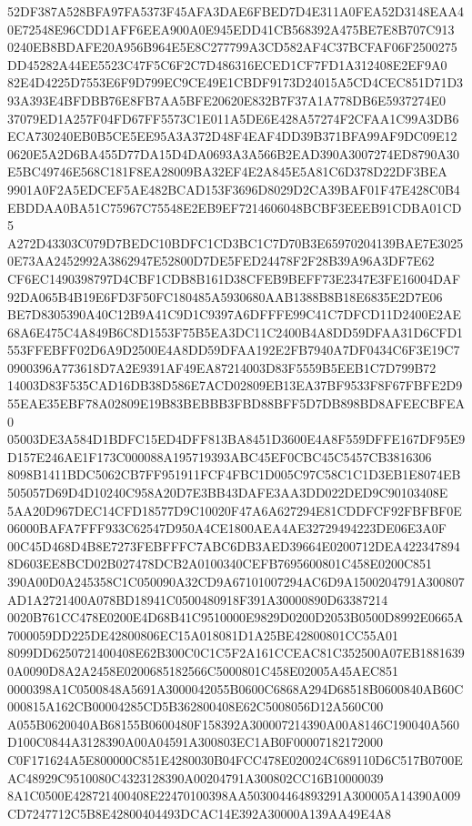 \documentclass[UTF8,fontset=fandol,zihao=-4,a4paper]{ctexart}
\begin{document}
{{52DF387A528BFA97FA5373F45AFA3DAE6FBED7D4E311A0FEA52D3148EAA40E72548E96CDD1AFF6EEA900A0E945EDD41CB568392A475BE7E8B707C913
0240EB8BDAFE20A956B964E5E8C277799A3CD582AF4C37BCFAF06F2500275DD45282A44EE5523C47F5C6F2C7D486316ECED1CF7FD1A312408E2EF9A0
82E4D4225D7553E6F9D799EC9CE49E1CBDF9173D24015A5CD4CEC851D71D393A393E4BFDBB76E8FB7AA5BFE20620E832B7F37A1A778DB6E5937274E0
37079ED1A257F04FD67FF5573C1E011A5DE6E428A57274F2CFAA1C99A3DB6ECA730240EB0B5CE5EE95A3A372D48F4EAF4DD39B371BFA99AF9DC09E12
0620E5A2D6BA455D77DA15D4DA0693A3A566B2EAD390A3007274ED8790A30E5BC49746E568C181F8EA28009BA32EF4E2A845E5A81C6D378D22DF3BEA
9901A0F2A5EDCEF5AE482BCAD153F3696D8029D2CA39BAF01F47E428C0B4EBDDAA0BA51C75967C75548E2EB9EF7214606048BCBF3EEEB91CDBA01CD5
A272D43303C079D7BEDC10BDFC1CD3BC1C7D70B3E65970204139BAE7E30250E73AA2452992A3862947E52800D7DE5FED24478F2F28B39A96A3DF7E62
CF6EC1490398797D4CBF1CDB8B161D38CFEB9BEFF73E2347E3FE16004DAF92DA065B4B19E6FD3F50FC180485A5930680AAB1388B8B18E6835E2D7E06
BE7D8305390A40C12B9A41C9D1C9397A6DFFFE99C41C7DFCD11D2400E2AE68A6E475C4A849B6C8D1553F75B5EA3DC11C2400B4A8DD59DFAA31D6CFD1
553FFEBFF02D6A9D2500E4A8DD59DFAA192E2FB7940A7DF0434C6F3E19C70900396A773618D7A2E9391AF49EA87214003D83F5559B5EEB1C7D799B72
14003D83F535CAD16DB38D586E7ACD02809EB13EA37BF9533F8F67FBFE2D955EAE35EBF78A02809E19B83BEBBB3FBD88BFF5D7DB898BD8AFEECBFEA0
05003DE3A584D1BDFC15ED4DFF813BA8451D3600E4A8F559DFFE167DF95E9D157E246AE1F173C000088A195719393ABC45EF0CBC45C5457CB3816306
8098B1411BDC5062CB7FF951911FCF4FBC1D005C97C58C1C1D3EB1E8074EB505057D69D4D10240C958A20D7E3BB43DAFE3AA3DD022DED9C90103408E
5AA20D967DEC14CFD18577D9C10020F47A6A627294E81CDDFCF92FBFBF0E06000BAFA7FFF933C62547D950A4CE1800AEA4AE32729494223DE06E3A0F
00C45D468D4B8E7273FEBFFFC7ABC6DB3AED39664E0200712DEA4223478948D603EE8BCD02B027478DCB2A0100340CEFB7695600801C458E0200C851
390A00D0A245358C1C050090A32CD9A67101007294AC6D9A1500204791A300807AD1A2721400A078BD18941C0500480918F391A30000890D63387214
0020B761CC478E0200E4D68B41C9510000E9829D0200D2053B0500D8992E0665A7000059DD225DE42800806EC15A018081D1A25BE42800801CC55A01
8099DD6250721400408E62B300C0C1C5F2A161CCEAC81C352500A07EB18816390A0090D8A2A2458E0200685182566C5000801C458E02005A45AEC851
0000398A1C0500848A5691A3000042055B0600C6868A294D68518B0600840AB60C000815A162CB00004285CD5B362800408E62C5008056D12A560C00
A055B0620040AB68155B0600480F158392A300007214390A00A8146C190040A560D100C0844A3128390A00A04591A300803EC1AB0F00007182172000
C0F171624A5E800000C851E4280030B04FCC478E020024C689110D6C517B0700EAC48929C9510080C4323128390A00204791A300802CC16B10000039
8A1C0500E428721400408E22470100398AA503004464893291A300005A14390A009CD7247712C5B8E42800404493DCAC14E392A30000A139AA49E4A8
}}
\end{document}
